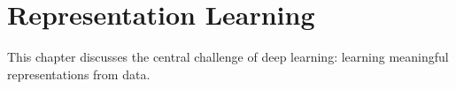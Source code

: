 
\chapter{Representation Learning}
\label{chap:representation-learning}

This chapter discusses the central challenge of deep learning: learning meaningful representations from data.






